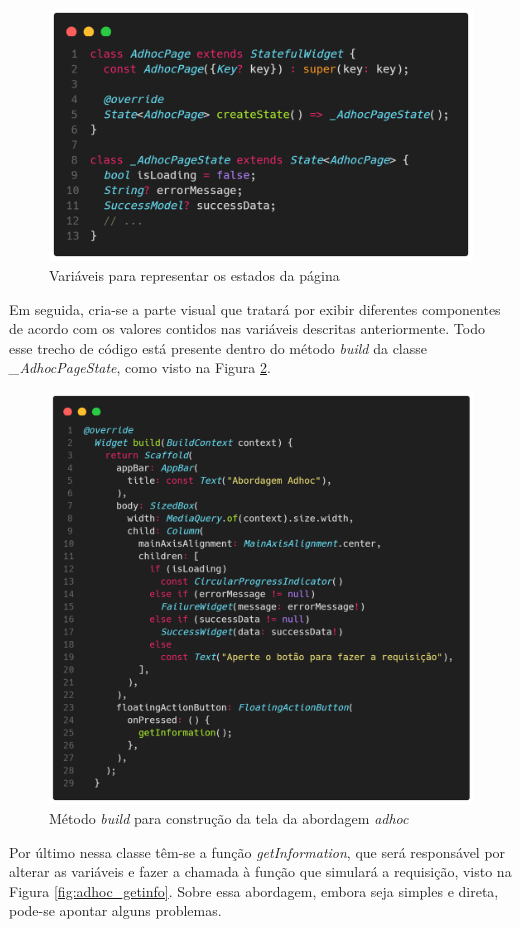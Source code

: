 \documentclass[12pt, %
openright, 
oneside, %
a4paper,    %
brazil]{facom-ufu-abntex2}
\begin{document}
\begin{figure}[ht]
    \centering
    \includegraphics[width=.65\textwidth, trim={0 30 0 100}, clip]{figures/states/variables.png}
    \caption{Variáveis para representar os estados da página}
    \label{fig:variables}
\end{figure}

Em seguida, cria-se a parte visual que tratará por exibir diferentes componentes de acordo com os valores contidos nas variáveis descritas anteriormente. Todo esse trecho de código está presente dentro do método \textit{build} da classe \textit{\_AdhocPageState}, como visto na Figura \ref{fig:adhoc_widget}.

\begin{figure}[ht]
    \centering
    \includegraphics[width=.65\textwidth, trim={0 30 0 100}, clip]{figures/states/adhoc_widget.png}
    \caption{Método \textit{build} para construção da tela da abordagem \textit{adhoc}}
    \label{fig:adhoc_widget}
\end{figure}

Por último nessa classe têm-se a função \textit{getInformation}, que será responsável por alterar as variáveis e fazer a chamada à função que simulará a requisição, visto na Figura \ref{fig:adhoc_getinfo}. Sobre essa abordagem, embora seja simples e direta, pode-se apontar alguns problemas.
\end{document}
